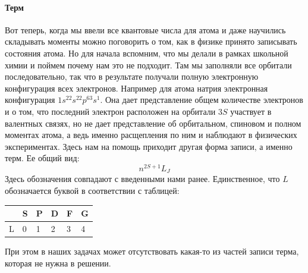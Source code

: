 \documentclass[12pt]{article}
\begin{document}
\paragraph{Терм}
Вот теперь, когда мы ввели все квантовые числа для атома и даже научились складывать моменты можно поговорить о том, как в физике принято записывать состояния атома. Но для начала вспомним, что мы делали в рамках школьной химии и поймем почему нам это не подходит. Там мы заполняли все орбитали последовательно, так что в результате получали полную электронную конфигурация всех электронов. Например для атома натрия электронная конфигурация $1s^22s^22p^63s^1$. Она дает представление общем количестве электронов и о том, что последний электрон расположен на орбитали $3S$ участвует в валентных связях, но не дает представление об орбитальном, спиновом и полном моментах атома, а ведь именно расщепления по ним и наблюдают в физических экспериментах. Здесь нам на помощь приходит другая форма записи, а именно терм. Ее общий вид:
\begin{equation*}
    n^{2S+1}L_J
\end{equation*}
Здесь обозначения совпадают с введенными нами ранее. Единственное, что $L$ обозначается буквой в соответствии с таблицей:
\begin{table}[H]
\begin{tabular}{|l|l|l|l|l|l|}
\hline
\multicolumn{1}{|c|}{} & \multicolumn{1}{c|}{S} & \multicolumn{1}{c|}{P} & \multicolumn{1}{c|}{D} & \multicolumn{1}{c|}{F} & \multicolumn{1}{c|}{G} \\ \hline
L                      & 0                      & 1                      & 2                      & 3                      & 4                      \\ \hline
\end{tabular}
\end{table}
При этом в наших задачах может отсутствовать какая-то из частей записи терма, которая не нужна в решении.
\end{document}
